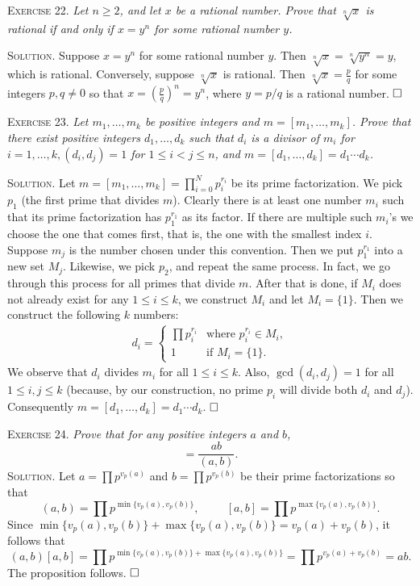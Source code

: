 \documentclass[11pt, leqno]{article}
\newcommand{\done}{\ensuremath{\hfill\square}}
\begin{document}
\textsc{Exercise 22}. \emph{Let $n\geq 2$, and let $x$ be a rational number. Prove that $\sqrt[n]{x}$ is rational if and only if $x = y^n$ for some rational number $y$.}

\textsc{Solution}. Suppose $x=y^n$ for some rational number $y$. Then $\sqrt[n]{x} = \sqrt[n]{y^n} = y$, which is rational. Conversely, suppose $\sqrt[n]{x}$ is rational. Then $\sqrt[n]{x} = \frac{p}{q}$ for some integers $p, q \ne 0$ so that $x = (\frac{p}{q})^n = y^n$, where $y = p/q$ is a rational number. \done

\textsc{Exercise 23}. \emph{Let $m_1, \ldots, m_k$ be positive integers and $m = [m_1, \ldots, m_k]$. Prove that there exist positive integers $d_1, \ldots, d_k$ such that $d_i$ is a divisor of $m_i$ for $i=1, \ldots, k, (d_i, d_j) = 1$ for $1 \leq i < j \leq n$, and $m = [d_1, \ldots, d_k] = d_1\cdots d_k$.}

\textsc{Solution}. Let $m = [m_1, \ldots, m_k] = \prod_{i=0}^N p_i^{r_i}$ be its prime factorization. We pick $p_1$ (the first prime that divides $m$). Clearly there is at least one number $m_i$ such that its prime factorization has $p_1^{r_1}$ as its factor. If there are multiple such $m_i$'s we choose the one that comes first, that is, the one with the smallest index $i$. Suppose $m_j$ is the number chosen under this convention. Then we put $p_1^{r_1}$ into a new set $M_j$. Likewise, we pick $p_2$, and repeat the same process. In fact, we go through this process for all primes that divide $m$. After that is done, if $M_i$ does not already exist for any $1 \leq i \leq k$, we construct $M_i$ and let $M_i = \{1\}$. Then we construct the following $k$ numbers:
\begin{align*}
  d_i =
  \begin{cases}
    \prod p_i^{r_i} & \text{where } p_i^{r_i} \in M_i, \\
    1 & \text{if } M_i=\{1\}.
  \end{cases}
\end{align*}
We observe that $d_i$ divides $m_i$ for all $1 \leq i \leq k$. Also, $\gcd(d_i, d_j) = 1$ for all $1 \leq i,j \leq k$ (because, by our construction, no prime $p_i$ will divide both $d_i$ and $d_j$). Consequently $ m = [d_1, \ldots, d_k] = d_1\cdots d_k$. \done

\textsc{Exercise 24}. \emph{Prove that for any positive integers $a$ and $b$, 
\begin{displaymath}
[a,b] = \frac{ab}{(a,b)}.
\end{displaymath}}\textsc{Solution}. Let $a = \prod p^{v_p(a)}$ and $b = \prod p^{v_p(b)}$ be their prime factorizations so that 
\begin{displaymath}
(a, b) = \prod p^{\min\{v_p(a), v_p(b)\}}, \hspace{1cm} [a,b] = \prod p^{\max\{v_p(a), v_p(b)\}}.
\end{displaymath}
Since $\min\{v_p(a), v_p(b)\} + \max\{v_p(a), v_p(b)\} = v_p(a) + v_p(b)$, it follows that 
\begin{displaymath}
(a, b)[a, b] = \prod p^{\min\{v_p(a), v_p(b)\} + \max\{v_p(a), v_p(b)\}} = \prod p^{v_p(a) + v_p(b)} = ab.
\end{displaymath}
The proposition follows. \done
\end{document}
